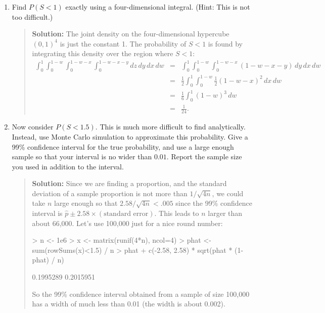 \documentclass{article}
\begin{document}
\begin{enumerate}
    \begin{enumerate}
  
    \item Find $P(S<1)$ exactly using a four-dimensional integral. (Hint: This
    is not too difficult.)
    \begin{quotation}{\bf Solution:}
    The joint density on the four-dimensional hypercube $(0,1)^4$ is just the
    constant 1.  The probability of $S<1$ is found by integrating 
    this density over the region where $S<1$:
    \begin{eqnarray*}
    \int_0^1 \int_0^{1-w} \int_0^{1-w-x} \int_0^{1-w-x-y} dz\, dy\, dx\, dw &=&
    \int_0^1 \int_0^{1-w} \int_0^{1-w-x} (1-w-x-y)\, dy\, dx\, dw \\ &=&
    \frac12\int_0^1 \int_0^{1-w} \frac12 (1-w-x)^2 \, dx\, dw \\ &=&
    \frac16 \int_0^1 (1-w)^3 \, dw \\ &=&
    \frac1{24}.
    \end{eqnarray*}
    \end{quotation}
        
    \item Now consider $P(S<1.5)$. This is much more difficult to find
    analytically. Instead, use Monte Carlo simulation to approximate this
    probability. Give a 99\% confidence interval for the true probability, and
    use a large enough sample so that your interval is no wider than $0.01$.
    Report the sample size you used in addition to the interval.
    \begin{quotation}{\bf Solution:}
    Since we are finding a proportion, and the standard deviation of 
    a sample proportion is not more than $1/\sqrt{4n}$, we could 
    take $n$ large enough
    so that $2.58/\sqrt{4n} < .005$ since the 99\% confidence interval is 
    $\hat p\pm 2.58\times (\mbox{standard error})$.  This leads to $n$ larger than
    about 66,000.  Let's use 100,000 just for a nice round number:
\begin{Schunk}
\begin{Sinput}
> n <- 1e6
> x <- matrix(runif(4*n), ncol=4)
> phat <- sum(rowSums(x)<1.5) / n
> phat + c(-2.58, 2.58) * sqrt(phat * (1-phat) / n)
\end{Sinput}
\begin{Soutput}
[1] 0.1995289 0.2015951
\end{Soutput}
\end{Schunk}
    So the 99\% confidence interval obtained from a sample of size 100,000
    has a width of much less than 0.01 (the width is about 0.002).
    \end{quotation}
        

\end{enumerate}
\end{enumerate}
\end{document}

